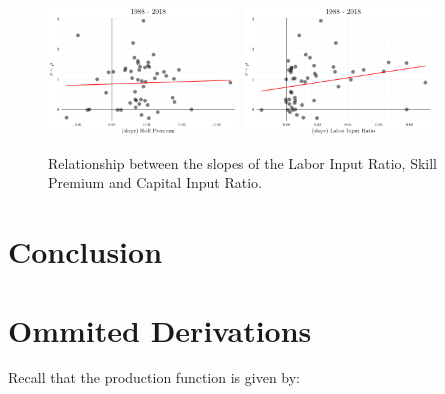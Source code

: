 \documentclass[12pt]{article}
\begin{document}
\begin{figure}[H]
 \centering
 \includegraphics[width=0.45\textwidth]{../images/corr_sp_sigma_rho.png}
 \hfill
 \includegraphics[width=0.45\textwidth]{../images/corr_li_sigma_rho.png}
 \caption{\label{fig:trends_correlation_csc} Relationship between the slopes of the Labor Input Ratio, Skill Premium and Capital Input Ratio.}
\end{figure}






\section{Conclusion}

\pagebreak{}




\pagebreak{}

\appendix

\section{Ommited Derivations}\label{sec:derivations}
Recall that the production function is given by:
\end{document}
